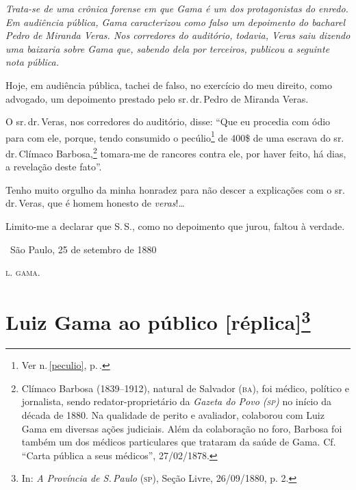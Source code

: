 {

\begin{resumo}
\emph{Trata-se de uma crônica forense em que Gama é um dos protagonistas
do enredo. Em audiência pública, Gama caracterizou como falso um
depoimento do bacharel Pedro de Miranda Veras. Nos corredores do
auditório, todavia, Veras saiu dizendo uma baixaria sobre Gama que,
sabendo dela por terceiros, publicou a seguinte nota pública. }
\end{resumo}

Hoje, em audiência pública, tachei de falso, no exercício do meu
direito, como advogado, um depoimento prestado pelo sr.\,dr.\,Pedro de
Miranda Veras.

O sr.\,dr.\,Veras, nos corredores do auditório, disse: ``Que eu procedia
com ódio para com ele, porque, tendo consumido o pecúlio\footnote{
  Ver n.\,\ref{peculio}, p.\,\pageref{peculio}.} de 400\$ de uma escrava do sr.\,dr.\,Clímaco Barbosa,\footnote{Clímaco Barbosa (1839--1912), natural de \label{climaco}
  Salvador (\textsc{ba}), foi médico, político e jornalista, sendo
  redator-proprietário da \emph{Gazeta do Povo (\textsc{sp})} no início da década
  de 1880. Na qualidade de perito e avaliador, colaborou com Luiz Gama
  em diversas ações judiciais. Além da colaboração no foro, Barbosa foi
  também um dos médicos particulares que trataram da saúde de Gama. Cf.
  ``Carta pública a seus médicos'', 27/02/1878.}
tomara-me de rancores
contra ele, por haver feito, há dias, a revelação deste fato''.

Tenho muito orgulho da minha honradez para não descer a explicações com
o sr.\,dr.\,Veras, que é homem honesto de \emph{veras}!\ldots{}

Limito-me a declarar que S.\,S., como no depoimento que jurou, faltou à
verdade.\medskip

\hfill\ São Paulo, 25 de setembro de 1880

\hfill\textsc{l. gama.}

\section{Luiz Gama ao público {[}réplica{]}\protect\footnote{\MakeUppercase{I}n:
  \emph{\MakeUppercase{A P}rovíncia de \MakeUppercase{S.\,P}aulo} (\textsc{sp}), \MakeUppercase{S}eção \MakeUppercase{L}ivre, 26/09/1880, p. 2.}}

}
